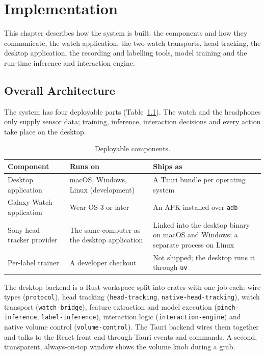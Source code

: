 \chapter{Implementation}\label{ch:implementation}

This chapter describes how the system is built: the components and how they communicate, the watch application, the two watch transports, head tracking, the desktop application, the recording and labelling tools, model training and the run-time inference and interaction engine.

\section{Overall Architecture}

The system has four deployable parts (Table~\ref{tab:components}). The watch and the headphones only supply sensor data; training, inference, interaction decisions and every action take place on the desktop.

\begin{table}[htbp]
\centering
\caption{Deployable components.}\label{tab:components}
\begin{tabularx}{\linewidth}{@{}l>{\raggedright\arraybackslash}X>{\raggedright\arraybackslash}X@{}}
\toprule
\textbf{Component} & \textbf{Runs on} & \textbf{Ships as} \\
\midrule
Desktop application & macOS, Windows, Linux (development) & A Tauri bundle per operating system \\
Galaxy Watch application & Wear OS 3 or later & An APK installed over \texttt{adb} \\
Sony head-tracker provider & The same computer as the desktop application & Linked into the desktop binary on macOS and Windows; a separate process on Linux \\
Per-label trainer & A developer checkout & Not shipped; the desktop runs it through \texttt{uv} \\
\bottomrule
\end{tabularx}
\end{table}

The desktop backend is a Rust workspace split into crates with one job each: wire types (\texttt{protocol}), head tracking (\texttt{head-tracking}, \texttt{native-head-tracking}), watch transport (\texttt{watch-bridge}), feature extraction and model execution (\texttt{pinch-inference}, \texttt{label-inference}), interaction logic (\texttt{interaction-engine}) and native volume control (\texttt{volume-control}). The Tauri backend wires them together and talks to the React front end through Tauri events and commands. A second, transparent, always-on-top window shows the volume knob during a grab.

